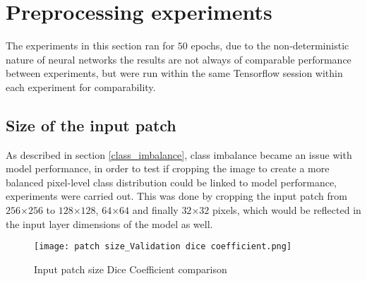 \section{Preprocessing experiments}
The experiments in this section ran for $50$ epochs, due to the non-deterministic nature of neural networks the results are not always of comparable performance between experiments, but were run within the same Tensorflow session within each experiment for comparability.
\subsection{Size of the input patch} \label{patch_size_exp}
As described in section \ref{class_imbalance}, class imbalance became an issue with model performance, in order to test if cropping the image to create a more balanced pixel-level class distribution could be linked to model performance, experiments were carried out. This was done by cropping the input patch from $256$×$256$ to $128$×$128$, $64$×$64$ and finally $32$×$32$ pixels, which would be reflected in the input layer dimensions of the model as well.

\begin{figure}[hbt!]
    \centering
    \texttt{[image: patch size\_Validation dice coefficient.png]}
    \caption{Input patch size Dice Coefficient comparison}
    \label{patch_dice}
\end{figure}
